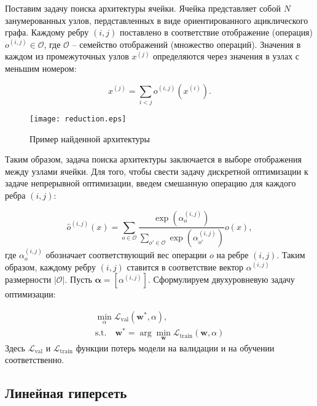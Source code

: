 \documentclass[12pt, twoside]{article}
\begin{document}
Поставим задачу поиска архитектуры ячейки.
 Ячейка представляет собой $N$ занумерованных узлов, пердставленных в виде ориентированного ациклического графа. Каждому ребру $(i, j)$ поставлено в соответствие  отображение (операция) $o^{(i, j)} \in \mathcal{O}$, где $\mathcal{O}$ -- семейство отображений (множество операций). Значения в каждом из промежуточных узлов $x^{(j)}$ определяются через значения в узлах с меньшим номером:
 
 \begin{equation}
 x^{(j)} = \sum_{i < j}o^{(i, j)}(x^{(i)}).
 \end{equation}
 
 \begin{figure}[H]
 \centering
 \texttt{[image: reduction.eps]}
 \caption{Пример найденной архитектуры}
 \end{figure}
 
 Таким образом, задача поиска архитектуры заключается в выборе отображения между узлами ячейки. Для того, чтобы свести задачу дискретной оптимизации к задаче непрерывной оптимизации, введем смешанную операцию для каждого ребра $(i, j)$:

\begin{equation}
\hat{o}^{(i, j)}(x) = \sum_{o\in \mathcal{O}} \frac{\exp(\alpha_o^{(i, j)})}{\sum_{o'\in\mathcal{O}} \exp(\alpha_{o'}^{(i, j)})}o(x),
\end{equation}
где $\alpha_o^{(i, j)}$ обозначает соответствующий вес операции $o$ на ребре $(i, j)$. Таким образом, каждому ребру $(i, j)$ ставится в соответствие вектор $\alpha^{(i, j)}$ размерности $|\mathcal{O}|$. Пусть $\boldsymbol\alpha = [\alpha^{(i, j)}]$. Сформулируем двухуровневую задачу оптимизации:

\begin{equation}
\label{optim}
\begin{aligned}
\min_{\alpha}\mathcal{L}_\text{val}(\mathbf{w}^*, \alpha),\\
 \mathrm{s.t.}\quad \mathbf{w}^* = \arg\min_{\mathbf{w}}\mathcal{L}_\text{train}(\mathbf{w}, \alpha)
 \end{aligned}
\end{equation}
Здесь $\mathcal{L}_\text{val}$ и $\mathcal{L}_\text{train}$ функции потерь модели на валидации и на обучении соответственно.

\subsection{Линейная гиперсеть}
\end{document}
